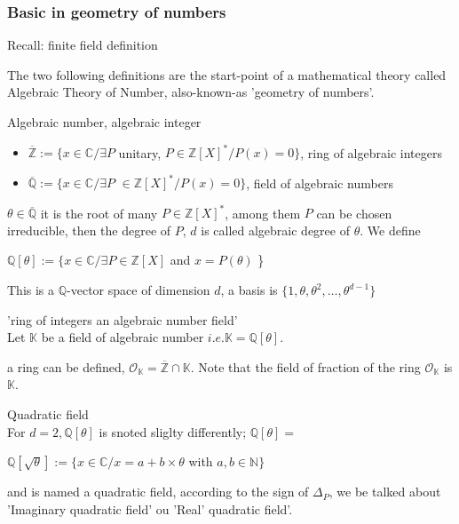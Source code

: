 \subsubsection{Basic in geometry of numbers}

Recall:  finite field definition

The two following definitions are the start-point of a mathematical theory 
called  Algebraic Theory of Number, also-known-as 'geometry of numbers'.\\
\begin{mydef}{Algebraic number, algebraic integer}
    \begin{itemize}
	    \item[] $\overline{\mathbb{Z}}:= \{x\in \mathbb{C}/\exists P$
	    unitary,  $P\in \mathbb{Z}[X]^{\ast} / P(x)=0 \}$, 
	    ring of algebraic integers
	    \item[] $\overline{\mathbb{Q}}:= \{x\in \mathbb{C}/\exists P$ 
        $\in \mathbb{Z}[X]^{\ast} / P(x)=0 \}$, field of algebraic numbers 
    \end{itemize}

$\theta \in \overline{\mathbb{Q}}$ it is the root of many 
$P \in \mathbb{Z}[X]^{\ast}$, among them $P$ can be chosen irreducible, then
the degree of $P$, $d$ is called algebraic degree of $\theta$. We define 
\begin{center}
$\mathbb{Q}[\theta] := \{ x \in \mathbb{C} / \exists P\in \mathbb{Z}[X]$ and $x=P(\theta)$ \}
\end{center}

This  is a $\mathbb{Q}$-vector space 
of dimension $d$, a basis is $ \{ 1, \theta, \theta^2, \hdots,  \theta^{d-1}\}$\\
\end{mydef}
\begin{mydef}{'ring of integers an algebraic number field'}\\
Let $\mathbb{K}$ be a field of algebraic number 
$\textit{i.e.} \mathbb{K} = \mathbb{Q}[\theta]$.

 a ring can be defined, 
$\mathcal{O}_\mathbb{K} =  \overline{\mathbb{Z}} \cap \mathbb{K}$. 
Note that the field of fraction of the ring $\mathcal{O}_\mathbb{K}$ is $\mathbb{K}$.\\
\end{mydef}

\begin{myprop}{Quadratic field}\\
For $d=2, \mathbb{Q}[\theta]$ is snoted sliglty differently;
$\mathbb{Q}[\theta]=$
	\begin{center}
		$\mathbb{Q}[\sqrt{\theta}] := \{ x \in \mathbb{C} / x=a+b \times \theta$ with
$ a,b \in \mathbb{N} \}$
	\end{center}


and is named a quadratic field, according to the sign of $\Delta_P$, we be talked about 
'Imaginary quadratic field' ou 'Real' quadratic field'.


\end{myprop}

